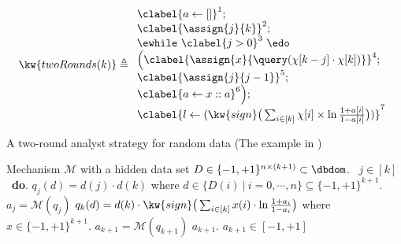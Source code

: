 
\begin{example}
    \label{ex:twoRoundsComplete}
    \[
        \kw{twoRounds(k)} \triangleq
    \begin{array}{l}
           \clabel{ a \leftarrow []}^{1} ; \\
            \clabel{\assign{j}{k} }^{2} ; \\
            \ewhile ~ \clabel{j > 0}^{3} ~ \edo ~ \\
            \Big(
             \clabel{\assign{x}{\query(\chi[k - j]\cdot \chi[k])} }^{4}  ; \\
             \clabel{\assign{j}{j-1}}^{5} ;\\
            \clabel{a \leftarrow x :: a}^{6}       \Big);\\
            \clabel{l \leftarrow (\kw{sign}\big (\sum_{i\in [k]} \chi[i]\times\ln\frac{1+a[i]}{1-a[i]} \big ))}^{7}\\
        \end{array}
    \]
    \begin{algorithm}
    \footnotesize
    \caption{A two-round analyst strategy for random data (The example in  \cite{dwork2015generalization})}
    \label{alg:twoRound}
    \begin{algorithmic}
    \REQUIRE Mechanism $\mathcal{M}$ with a hidden data set $D \in \{-1,+1\}^{n\times (k+1)} \subset \dbdom$.
    \ $j\in [k]$\ {\bf do}.  
    \STATE {} $q_j(d)=d(j)\cdot d(k)$ where $d \in \{D(i) ~|~ i = 0, \cdots, n\} \subseteq \{-1,+1\}^{k+1}$.
    \STATE {} $a_j=\mathcal{M}(q_j)$ 
    \STATE \qquad {}
     $q_{k}(d)= d(k) \cdot \kw{sign}\big (\sum_{i\in [k]} x(i) \cdot \ln\frac{1+a_i}{1-a_i} \big )$ where $x\in \{-1,+1\}^{k+1}$.
    \STATE{}
     $a_{k+1}=\mathcal{M}(q_{k+1})$
    \STATE{}
    \RETURN $a_{k+1}$.
    \ENSURE $a_{k+1}\in [-1,+1]$
    \end{algorithmic}
    \end{algorithm}
%
    \end{example}